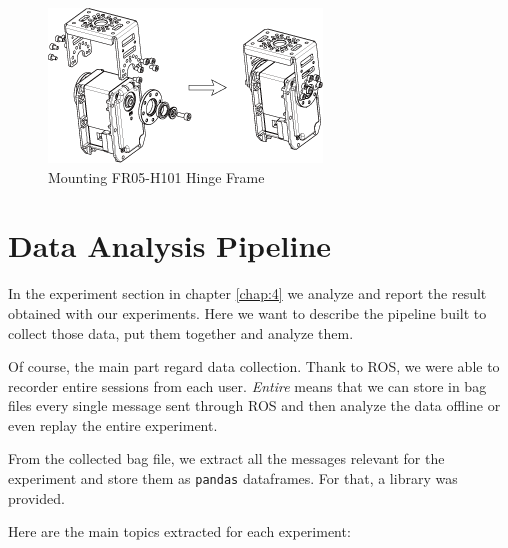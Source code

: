 \begin{figure}
	\centering
	\includegraphics[width=.7\textwidth]{img/rx-64_fr05-h101.png}%
	\caption{Mounting FR05-H101 Hinge Frame}
	\label{fig:h101Mounting}
\end{figure}

\section{Data Analysis Pipeline}
In the experiment section in chapter \ref{chap:4} we analyze and report the result obtained with our experiments. Here we want to describe the pipeline built to collect those data, put them together and analyze them.

Of course, the main part regard data collection. Thank to ROS, we were able to recorder entire sessions from each user. \textit{Entire} means that we can store in bag files every single message sent through ROS and then analyze the data offline or even replay the entire experiment.

From the collected bag file, we extract all the messages relevant for the experiment and store them as \texttt{pandas} dataframes. For that, a library was provided.

Here are the main topics extracted for each experiment:

